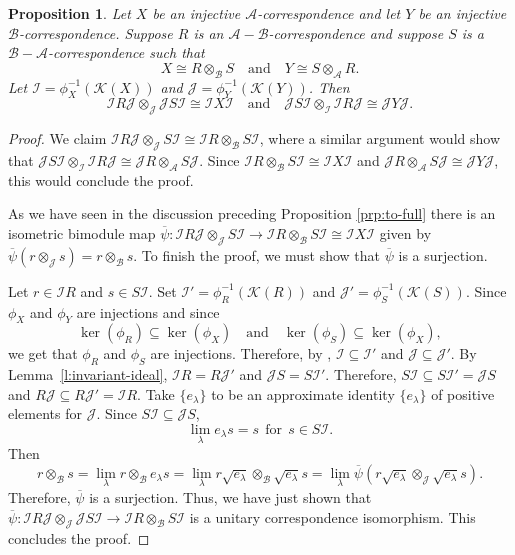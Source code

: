 \documentclass[11pt, letterpaper,final]{amsart}
\newcommand{\A}{{\mathcal{A}}}
\newcommand{\B}{{\mathcal{B}}}
\newcommand{\I}{{\mathcal{I}}}
\newcommand{\J}{{\mathcal{J}}}
\newcommand{\K}{{\mathcal{K}}}
\newtheorem{prp}[thm]{Proposition}
\theoremstyle{definition}
\begin{document}
\begin{prp} \label{prp:to-regular}
Let $X$ be an injective $\A$-correspondence and let $Y$ be an injective $\B$-correspondence.  Suppose $R$ is an $\A-\B$-correspondence and suppose $S$ is a $\B-\A$-correspondence such that 
$$
X \cong R \otimes_{\B} S \quad \text{and} \quad Y \cong S \otimes_{\A} R.
$$
Let $\I = \phi_X^{-1}(\K(X))$ and $\J = \phi_Y^{-1}(\K(Y))$.  Then  
$$
\I R \J \otimes_{\J} \J S \I \cong \I X \I \quad \text{and} \quad \J S \I \otimes_{\I} \I R \J \cong \J Y \J.$$
\end{prp}

\begin{proof}
We claim $\I R \J \otimes_{\J} S \I \cong \I R \otimes_{\B} S \I$, where a similar argument would show that $\J S \I \otimes_{\I} \I R \J \cong \J R \otimes_{\A} S \J$. Since $\I R \otimes_{\B} S \I \cong \I X \I$ and $ \J R \otimes_{\A} S \J \cong \J Y \J$, this would conclude the proof.

As we have seen in the discussion preceding Proposition \ref{prp:to-full} there is an isometric bimodule map $\overline{\psi} : \I R \J \otimes_{\J} S \I \rightarrow \I R \otimes_{\B} S \I \cong \I X \I$ given by $\overline{\psi}(r\otimes_{\J} s) = r\otimes_{\B} s$. To finish the proof, we must show that $\overline{\psi}$ is a surjection.

Let $r \in \I R$ and $s \in S \I$.  Set $\I' = \phi_R^{-1}(\K(R))$ and $\J' = \phi_S^{-1} (\K(S))$.  Since $\phi_X$ and $\phi_Y$ are injections and since
$$
\ker( \phi_R ) \subseteq \ker( \phi_X) \quad \text{and} \quad \ker(\phi_S) \subseteq \ker(\phi_X),
$$
we get that $\phi_R$ and $\phi_S$ are injections. Therefore, by \cite[Lemma~4.2]{FMR-IUMJ2003}, $\I \subseteq \I'$ and $\J \subseteq \J'$. By Lemma~\ref{l:invariant-ideal}, $\I R = R \J'$ and $\J S = S \I'$.  Therefore, $S \I \subseteq S \I' = \J S$ and $R \J \subseteq R \J' = \I R$.  Take $\{ e_\lambda \}$ to be an approximate identity $\{e_\lambda\}$ of positive elements for $\J$.  Since $S\I \subseteq \J S$,
$$
\lim_\lambda e_\lambda s = s \ \ \text{for} \ \ s\in S \I.
$$
Then
$$
r\otimes_{\B} s = \lim_{\lambda } r \otimes_{\B} e_\lambda s = \lim_{ \lambda } r \sqrt{e_{\lambda}} \otimes_{\B} \sqrt{e_{\lambda }}s = \lim_{ \lambda }\overline{\psi} ( r \sqrt{e_\lambda} \otimes_{\J}  \sqrt{e_\lambda} s ).
$$
Therefore, $\overline{\psi}$ is a surjection. Thus, we have just shown that $\overline{\psi} \colon \I R \J \otimes_{\J} \J S \I \to \I R \otimes_{\B} S \I$ is a unitary correspondence isomorphism. This concludes the proof.
\end{proof}
\end{document}
